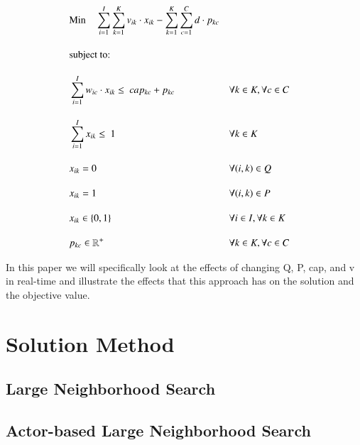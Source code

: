 \documentclass[preprint,12pt,authoryear]{elsarticle}
\begin{document}
\begin{alignat}{2}
	& \text{Min} \quad \sum_{i = 1}^{I} \sum_{k = 1}^{K} v_{ik} \cdot x_{ik} - \sum_{k = 1}^{K} \sum_{c = 1}^C d \cdot p_{kc} \label{eqn:objective_function_strategic} \\[1em]
    & \text{subject to:} \notag                                                                                                                                        \\[1em]
	& \sum_{i=1}^I w_{ic} \cdot x_{ik} \leq \ cap_{kc} + p_{kc}        && \forall k \in K, \forall c \in C                    \label{eqn:capacity_constraint}          \\[1em]
	& \sum_{i = 1}^{I} x_{ik} \leq \ 1                               && \forall k \in K                                       \label{eqn:single_workorder_constraint}  \\[1em]
	& x_{ik} = 0                                                     && \forall (i, k) \in Q                                  \label{eqn:exclusion_constraint}         \\[1em]
	& x_{ik} = 1                                                     && \forall (i, k) \in P                                  \label{eqn:inclusion_constraint}         \\[1em]
	& x_{ik} \in \{0, 1\}                                            && \forall i \in I, \forall k \in K                      \label{eqn:x_integrality_constraint}     \\[1em] 
	& p_{kc} \in \mathbb{R}^{+}                                      && \forall k \in K, \forall c \in C                      \label{eqn:p_non_negativity_constraint}
\end{alignat}


In this paper we will specifically look at the effects of changing Q, P, cap, and v in real-time and illustrate the effects that this approach has on the solution and the objective value.

\section{Solution Method}
\label{sec2}

\subsection{Large Neighborhood Search}

\subsection{Actor-based Large Neighborhood Search}
\end{document}
